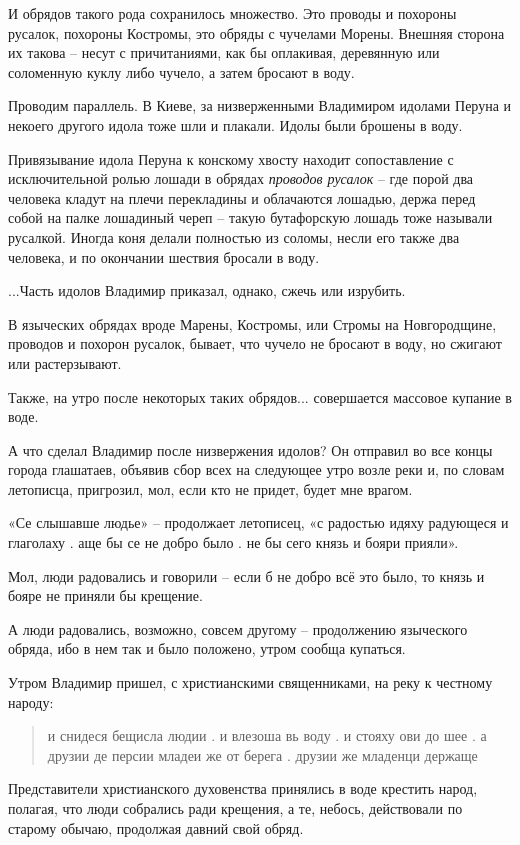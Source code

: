 \documentclass[a5paper,11pt,openany]{article}
\begin{document}
   И обрядов такого рода сохранилось множество. Это проводы и похороны русалок, похороны Костромы, это обряды с чучелами Морены. Внешняя сторона их такова – 
несут с причитаниями, как бы оплакивая, деревянную или соломенную куклу либо чучело, а затем бросают в воду.

   Проводим параллель. В Киеве, за низверженными Владимиром идолами Перуна и некоего другого идола тоже шли и плакали. Идолы были брошены в воду.

   Привязывание идола Перуна к конскому хвосту находит сопоставление с исключительной ролью лошади в обрядах \textit{проводов русалок} – где порой два человека кладут на плечи перекладины и облачаются лошадью, держа перед собой на палке лошадиный череп – такую бутафорскую лошадь тоже называли русалкой. Иногда коня делали полностью из соломы, несли его также два человека, и по окончании шествия бросали в воду.

   ...Часть идолов Владимир приказал, однако, сжечь или изрубить.

   В языческих обрядах вроде Марены, Костромы, или Стромы на Новгородщине, проводов и похорон русалок, бывает, что чучело не бросают в воду, но сжигают или растерзывают. 

   Также, на утро после некоторых таких обрядов... совершается массовое купание в воде.

   А что сделал Владимир после низвержения идолов? Он отправил во все концы города глашатаев, объявив сбор всех на следующее утро возле реки и, по словам летописца, пригрозил, мол, если кто не придет, будет мне врагом.

«Се слышавше людье» – продолжает летописец, «с радостью идяху радующеся и глаголаху . аще бы се не добро было . не бы сего князь и бояри прияли».

   Мол, люди радовались и говорили – если б не добро всё это было, то князь и бояре не приняли бы крещение. 

   А люди радовались, возможно, совсем другому – продолжению языческого обряда, ибо в нем так и было положено, утром сообща купаться.

   Утром Владимир пришел, с христианскими священниками, на реку к честному народу:
 
\begin{quotation}
\noindent и снидеся бещисла людии . и влезоша вь воду . и стояху ови до шее . а друзии де персии младеи же от берега . друзии же младенци держаще
\end{quotation}

Представители христианского духовенства принялись в воде крестить народ, полагая, что люди собрались ради крещения, а те, небось, действовали по старому обычаю, продолжая давний свой обряд.
\end{document}
